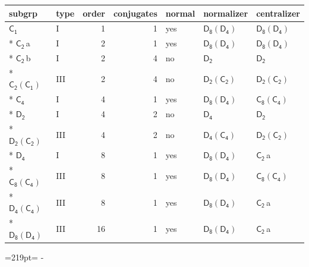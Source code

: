 \documentclass[10pt,a4paper]{article}
\newcommand{\needspace}[1]{\par\penalty-100\begingroup\dimen0=#1\relax\dimen2=\pagegoal
  \advance\dimen2-\pagetotal\ifdim\dimen0>\dimen2\relax\ifdim\dimen2>0pt\vfil\break\fi\fi
  \endgroup}
\numberwithin{equation}{section}
\newcommand{\grp}[1]{\mathsf{#1}}
\newcommand{\clsletter}[1]{\,{\scriptsize\color{black!55}#1}}
\begin{document}
{\small\begin{longtable}{@{}llrrlll@{}}\toprule
subgrp & type & order & conjugates & normal & normalizer & centralizer\\\midrule\endhead
\bottomrule\endfoot\endlastfoot
\href{../../../rotation/data/pdf/C1.pdf}{$\grp{C_{1}}$} & I & 1 & 1 & yes & \href{D8-D4.pdf}{$\grp{D_{8}}(\grp{D_{4}})$} & \href{D8-D4.pdf}{$\grp{D_{8}}(\grp{D_{4}})$}\\*
\href{../../../rotation/data/pdf/C2.pdf}{$\grp{C_{2}}$}\clsletter{a} & I & 2 & 1 & yes & \href{D8-D4.pdf}{$\grp{D_{8}}(\grp{D_{4}})$} & \href{D8-D4.pdf}{$\grp{D_{8}}(\grp{D_{4}})$}\\*
\href{../../../rotation/data/pdf/C2.pdf}{$\grp{C_{2}}$}\clsletter{b} & I & 2 & 4 & no & \href{../../../rotation/data/pdf/D2.pdf}{$\grp{D_{2}}$} & \href{../../../rotation/data/pdf/D2.pdf}{$\grp{D_{2}}$}\\*
\href{C2-C1.pdf}{$\grp{C_{2}}(\grp{C_{1}})$} & III & 2 & 4 & no & \href{D2-C2.pdf}{$\grp{D_{2}}(\grp{C_{2}})$} & \href{D2-C2.pdf}{$\grp{D_{2}}(\grp{C_{2}})$}\\*
\href{../../../rotation/data/pdf/C4.pdf}{$\grp{C_{4}}$} & I & 4 & 1 & yes & \href{D8-D4.pdf}{$\grp{D_{8}}(\grp{D_{4}})$} & \href{C8-C4.pdf}{$\grp{C_{8}}(\grp{C_{4}})$}\\*
\href{../../../rotation/data/pdf/D2.pdf}{$\grp{D_{2}}$} & I & 4 & 2 & no & \href{../../../rotation/data/pdf/D4.pdf}{$\grp{D_{4}}$} & \href{../../../rotation/data/pdf/D2.pdf}{$\grp{D_{2}}$}\\*
\href{D2-C2.pdf}{$\grp{D_{2}}(\grp{C_{2}})$} & III & 4 & 2 & no & \href{D4-C4.pdf}{$\grp{D_{4}}(\grp{C_{4}})$} & \href{D2-C2.pdf}{$\grp{D_{2}}(\grp{C_{2}})$}\\*
\href{../../../rotation/data/pdf/D4.pdf}{$\grp{D_{4}}$} & I & 8 & 1 & yes & \href{D8-D4.pdf}{$\grp{D_{8}}(\grp{D_{4}})$} & \href{../../../rotation/data/pdf/C2.pdf}{$\grp{C_{2}}$}\clsletter{a}\\*
\href{C8-C4.pdf}{$\grp{C_{8}}(\grp{C_{4}})$} & III & 8 & 1 & yes & \href{D8-D4.pdf}{$\grp{D_{8}}(\grp{D_{4}})$} & \href{C8-C4.pdf}{$\grp{C_{8}}(\grp{C_{4}})$}\\*
\href{D4-C4.pdf}{$\grp{D_{4}}(\grp{C_{4}})$} & III & 8 & 1 & yes & \href{D8-D4.pdf}{$\grp{D_{8}}(\grp{D_{4}})$} & \href{../../../rotation/data/pdf/C2.pdf}{$\grp{C_{2}}$}\clsletter{a}\\*
\href{D8-D4.pdf}{$\grp{D_{8}}(\grp{D_{4}})$} & III & 16 & 1 & yes & \href{D8-D4.pdf}{$\grp{D_{8}}(\grp{D_{4}})$} & \href{../../../rotation/data/pdf/C2.pdf}{$\grp{C_{2}}$}\clsletter{a}\\
\bottomrule\end{longtable}}
\needspace{219pt}
\end{document}
